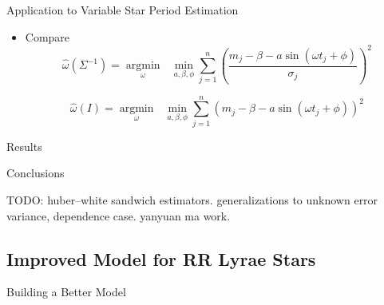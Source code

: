 \documentclass[12pt]{beamer}
\newcommand{\argmin}[1]{\underset{#1}{\operatorname{argmin}}\text{ }}
\newcommand{\todo}[1]{{\color{red}TODO: #1}}
\begin{document}
\begin{frame}{Application to Variable Star Period Estimation}
\begin{itemize}


  
\item Compare
  \begin{equation*}
    \widehat{\omega}(\Sigma^{-1}) = \argmin{\omega} \min_{a,\beta,\phi} \sum_{j=1}^{n} \left(\frac{m_{j} - \beta - a\sin(\omega t_{j} + \phi)}{\sigma_{j}}\right)^2
  \end{equation*}

  \begin{equation*}
    \widehat{\omega}(I) = \argmin{\omega} \min_{a,\beta,\phi} \sum_{j=1}^{n} \left(m_{j} - \beta - a\sin(\omega t_{j} + \phi)\right)^2
  \end{equation*}

  
  
  
\end{itemize}
\end{frame}


\begin{frame}{Results}


\end{frame}


\begin{frame}{Conclusions}

\todo{huber--white sandwich estimators. generalizations to unknown error variance, dependence case. yanyuan ma work.}
  
\end{frame}




\subsection{Improved Model for RR Lyrae Stars}

\begin{frame}{Building a Better Model}

\end{frame}
\end{document}
